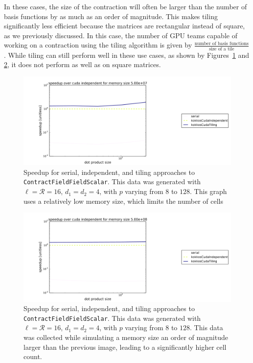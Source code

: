 In these cases, the size of the contraction will often be larger than the number
of basis functions by as much as an order of magnitude. This makes tiling
significantly less efficient because the matrices are rectangular instead of
square, as we previously discussed. In this case, the number of GPU teams
capable of working on a contraction using the tiling algorithm is given by
$\frac{\text{number of basis functions}}{\text{size of a tile}}$. While tiling
can still perform well in these use cases, as shown by
Figures~\ref{fig:multiDTiling1} and \ref{fig:multiDTiling2}, it does not perform
as well as on square matrices.

\begin{figure}[H]
    \centering
\includegraphics[scale = .2]{CFFTTiling1}
\caption{Speedup for serial, independent, and tiling approaches to \texttt{ContractFieldFieldScalar}. This data was generated with $\ell=\mathcal{R}=16$, $d_1=d_2=4$, with $p$ varying from $8$ to $128$. This graph uses a relatively low memory size, which limits the number of cells}
\label{fig:multiDTiling1}
\end{figure}

\begin{figure}[H]
    \centering
\includegraphics[scale = .2]{CFFTTiling2}
\caption{Speedup for serial, independent, and tiling approaches to \texttt{ContractFieldFieldScalar}. This data was generated with $\ell=\mathcal{R}=16$, $d_1=d_2=4$, with $p$ varying from $8$ to $128$. This data was collected while simulating a memory size an order of magnitude larger than the previous image, leading to a significantly higher cell count. }
\label{fig:multiDTiling2}
\end{figure}

